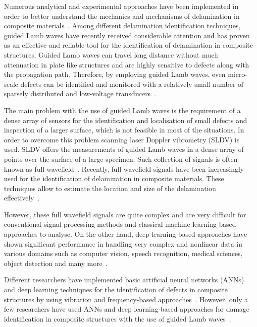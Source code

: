 \documentclass{IOS-Book-Article}
\begin{document}
Numerous analytical and experimental approaches have been implemented in order 
to better understand the mechanics and mechanisms of delamination in composite 
materials~\cite{Jih1993}\cite{Sohn2011}\cite{Khan2018}.
Among different delamination identification techniques, guided Lamb waves have 
recently received considerable attention and has proven as an effective and 
reliable tool for the identification of delamination in composite structures.
Guided Lamb waves can travel long distance without much attenuation in plate 
like structures and are highly sensitive to defects along with the propagation 
path. 
Therefore, by employing guided Lamb waves, even micro-scale defects can be 
identified and monitored with a relatively small number of sparsely distributed 
and low-voltage 
transducers~\cite{Harb2016}\cite{Cawley2003}.  


The main problem with the use of guided Lamb waves is the requirement of a 
dense array of sensors for the identification and localisation of small 
defects and inspection of a larger surface, which is not feasible in most of 
the situations.
In order to overcome this problem scanning laser Doppler vibrometry (SLDV) is 
used.
SLDV offers the measurements of guided Lamb waves in a dense array of points 
over the surface of a large specimen.
Such collection of signals is often known as full wavefield~\cite{Kudela2019}.
Recently, full wavefield signals have been increasingly used for the 
identification of delamination in composite materials. 
These techniques allow to estimate the location and size of the delamination 
effectively~\cite{Kudela2018}\cite{Girolamo2018}.   

However, these full wavefield signals are quite complex and are very difficult 
for conventional signal processing methods and classical machine learning-based 
approaches to analyse.
On the other hand, deep learning-based approaches have shown significant 
performance in handling very complex and nonlinear data in various domains such 
as computer vision, speech recognition, medical sciences, object detection and 
many more~\cite{Deng2014}.

Different researchers have implemented basic artificial neural networks (ANNs) 
and deep learning techniques for the identification of defects in composite 
structures by using vibration and frequency-based 
approaches~\cite{Islam1994}\cite{Khan2019}\cite{Okafor1996}.
However, only a few researchers have used ANNs and deep learning-based 
approaches for damage identification in composite structures with the use of 
guided Lamb 
waves~\cite{Chetwynd2008}\cite{Fenza2015}\cite{Feng2019}\cite{Rautela2021}. 
\end{document}
